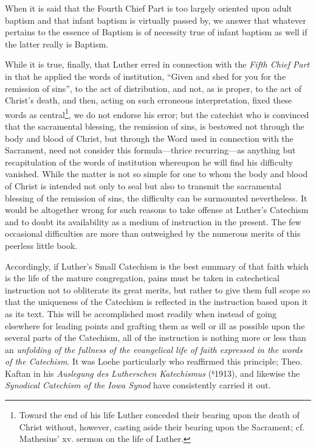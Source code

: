 When it is said that the Fourth Chief Part is too largely oriented
upon adult baptism and that infant baptism is virtually passed by, we answer that whatever pertains to the essence of Baptism is of necessity true of infant baptism as well if the latter really is Baptism.

While it is true, finally, that Luther erred in connection with the \emph{Fifth Chief Part} in that he applied the words of institution, “Given and shed for you for the remission of sins”, to the act of distribution, and not, as is proper, to the act of Christ’s death, and then, acting on such erroneous interpretation, fixed these words as central\footnote{Toward the end of his life Luther conceded their bearing upon the death of Christ without, however, casting aside their bearing upon the Sacrament; cf. Mathesius’ xv. sermon on the life of Luther.}, we do not endorse his error; but the catechist who is convinced that the sacramental blessing, the remission of sins, is bestowed not through the body and blood of Christ, but through the Word used in connection with the Sacrament, need not consider this formula—thrice recurring—as anything but recapitulation of the words of institution whereupon he will find his difficulty vanished. While the matter is not so simple for one to whom the body and blood of Christ is intended not only to seal but also to transmit the sacramental blessing of the remission of sins, the difficulty can be surmounted nevertheless. It would be altogether wrong for such reasons to take offense at Luther’s Catechism and to doubt its availability as a medium of instruction in the present. The few occasional difficulties are more than outweighed by the numerous merits of this peerless little book.

Accordingly, if Luther’s Small Catechism is the best summary of that faith which is the life of the mature congregation, pains must be taken in catechetical instruction not to obliterate its great merits, but rather to give them full scope so that the uniqueness of the Catechism is reflected in the instruction based upon it as its text. This will be accomplished most readily when instead of going elsewhere for leading points and grafting them as well or ill as possible upon the several parts of the Catechism, all of the instruction is nothing more or less than an \emph{unfolding of the fullness of the evangelical life of faith expressed in the words of the Catechism}. It was Loehe particularly who reaffirmed this principle; Theo. Kaftan in his \emph{Auslegung des Lutherschen Katechismus} (⁶1913), and likewise
the \emph{Synodical Catechism of the Iowa Synod} have consistently carried it out.

